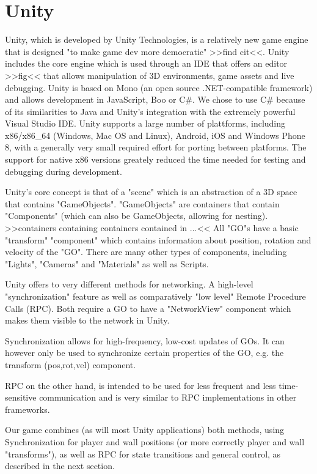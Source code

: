 \documentclass{report}
\begin{document}
\section{Unity}
Unity, which is developed by Unity Technologies, is a relatively new game engine that is designed "to make game dev more democratic" >>find cit<<.
Unity includes the core engine which is used through an IDE that offers an editor >>fig<< that allows manipulation of 3D environments, game assets and live debugging.
Unity is based on Mono (an open source .NET-compatible framework) and allows development in JavaScript, Boo or C\#. 
We chose to use C\# because of its similarities to Java and Unity's integration with the extremely powerful Visual Studio IDE.
Unity supports a large number of plattforms, including x86/x86\_64 (Windows, Mac OS and Linux), Android, iOS and Windows Phone 8, with a generally very small required effort for porting between platforms.
The support for native x86 versions greately reduced the time needed for testing and debugging during development.

Unity's core concept is that of a "scene" which is an abstraction of a 3D space that contains "GameObjects".
"GameObjects" are containers that contain "Components" (which can also be GameObjects, allowing for nesting).
>>containers containing containers contained in ...<<
All "GO"s have a basic "transform" "component" which contains information about position, rotation and velocity of the "GO". There are many other types of components, including "Lights", "Cameras" and "Materials" as well as Scripts.

Unity offers to very different methods for networking.
A high-level "synchronization" feature as well as comparatively "low level"  Remote Procedure Calls (RPC).
Both require a GO to have a "NetworkView" component which makes them visible to the network in Unity.

Synchronization allows for high-frequency, low-cost updates  of GOs. It can however only be used to synchronize certain properties of the GO, e.g. the transform (pos,rot,vel) component.

RPC on the other hand, is intended to be used for less frequent and less time-sensitive communication and is very similar to RPC implementations in other frameworks.

Our game combines (as will most Unity applications) both methods, using Synchronization for player and wall positions (or more correctly player and wall "transforms"), as well as RPC for state transitions and general control, as described in the next section. 
\end{document}
